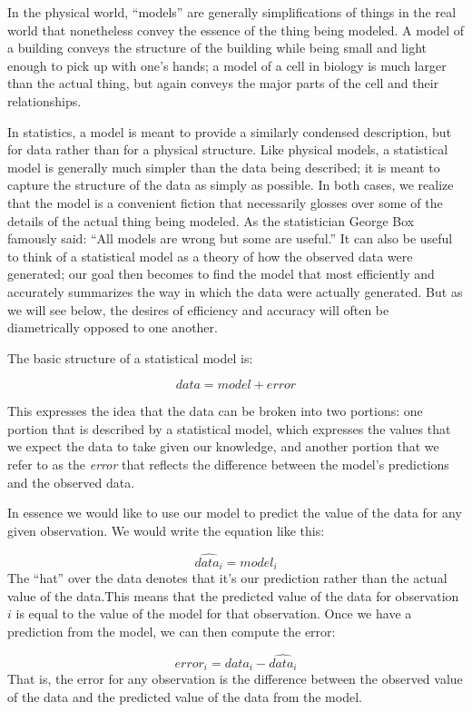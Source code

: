 \documentclass[12pt,]{book}
\theoremstyle{definition}
\theoremstyle{definition}
\theoremstyle{definition}
\theoremstyle{remark}
\begin{document}
In the physical world, ``models'' are generally simplifications of things in the real world that nonetheless convey the essence of the thing being modeled. A model of a building conveys the structure of the building while being small and light enough to pick up with one's hands; a model of a cell in biology is much larger than the actual thing, but again conveys the major parts of the cell and their relationships.

In statistics, a model is meant to provide a similarly condensed description, but for data rather than for a physical structure. Like physical models, a statistical model is generally much simpler than the data being described; it is meant to capture the structure of the data as simply as possible. In both cases, we realize that the model is a convenient fiction that necessarily glosses over some of the details of the actual thing being modeled. As the statistician George Box famously said: ``All models are wrong but some are useful.'' It can also be useful to think of a statistical model as a theory of how the observed data were generated; our goal then becomes to find the model that most efficiently and accurately summarizes the way in which the data were actually generated. But as we will see below, the desires of efficiency and accuracy will often be diametrically opposed to one another.

The basic structure of a statistical model is:

\[
data = model + error
\]

This expresses the idea that the data can be broken into two portions: one portion that is described by a statistical model, which expresses the values that we expect the data to take given our knowledge, and another portion that we refer to as the \emph{error} that reflects the difference between the model's predictions and the observed data.

In essence we would like to use our model to predict the value of the data for any given observation. We would write the equation like this:

\[
\widehat{data_i} = model_i
\]
The ``hat'' over the data denotes that it's our prediction rather than the actual value of the data.This means that the predicted value of the data for observation \(i\) is equal to the value of the model for that observation. Once we have a prediction from the model, we can then compute the error:

\[
error_i = data_i - \widehat{data_i}
\]
That is, the error for any observation is the difference between the observed value of the data and the predicted value of the data from the model.
\end{document}
